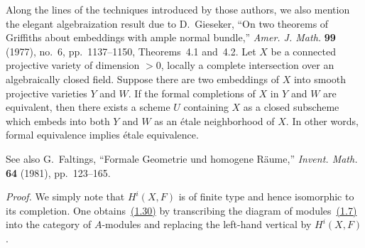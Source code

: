 Along the lines of the techniques introduced by those authors, we also mention
the elegant algebraization result due to D.~Gieseker, ``On two theorems of
Griffiths about embeddings with ample normal bundle,'' \emph{Amer. J. Math.}
\textbf{99} (1977), no.~6, pp.~1137--1150, Theorems~4.1 and~4.2. Let $X$ be a
connected projective variety of dimension $>0$, locally a complete intersection
over an algebraically closed field. Suppose there are two embeddings of $X$
into smooth projective varieties $Y$ and $W$. If the formal completions of $X$
in $Y$ and $W$ are equivalent, then there exists a scheme $U$ containing $X$
as a closed subscheme which embeds into both $Y$ and $W$ as an étale
neighborhood of $X$. In other words, formal equivalence implies étale
equivalence.

See also G.~Faltings, ``Formale Geometrie und homogene Räume,''
\emph{Invent. Math.} \textbf{64} (1981), pp.~123--165.

\medskip
{}

\noindent\emph{Proof.}\quad
We simply note that $H^i(X,F)$ is of finite type and hence isomorphic to its
completion. One obtains~\hyperref[eq:IX.1.30]{(1.30)} by transcribing the diagram of modules~\hyperref[eq:IX.1.7]{(1.7)}
into the category of $A$-modules and replacing the left-hand vertical by
$H^i(X,F)$.

\medskip
{}

